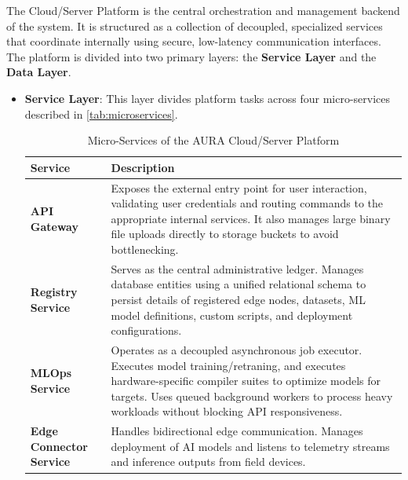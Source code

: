 The Cloud/Server Platform is the central orchestration and management backend of the system. It is structured as a collection of decoupled, specialized services that coordinate internally using secure, low-latency communication interfaces. The platform is divided into two primary layers: the \textbf{Service Layer} and the \textbf{Data Layer}.

\begin{itemize}
    
    \item \textbf{Service Layer}: This layer divides platform tasks across four micro-services described in \autoref{tab:microservices}.

    \begin{table}[H]
        \centering
        \caption{Micro-Services of the \acrshort{AURA} Cloud/Server Platform}
        \label{tab:microservices}
        \begin{tabular}{p{}p{}}
            \hline
            \textbf{Service} & \textbf{Description} \\
            \hline
            \textbf{\gls{API} Gateway} &
                Exposes the external entry point for user interaction, validating user credentials and routing commands to the appropriate internal services. It also manages large binary file uploads directly to storage buckets to avoid bottlenecking. \\
            \textbf{Registry Service} &
                Serves as the central administrative ledger. Manages database entities using a unified relational schema to persist details of registered edge nodes, datasets, \gls{ML} model definitions, custom scripts, and deployment configurations. \\
            \textbf{\gls{MLOps} Service} &
                Operates as a decoupled asynchronous job executor. Executes model training/retraning, and executes hardware-specific compiler suites to optimize models for targets. Uses queued background workers to process heavy workloads without blocking \gls{API} responsiveness. \\
            \textbf{Edge Connector Service} &
                Handles bidirectional edge communication. Manages deployment of \gls{AI} models and listens to telemetry streams and inference outputs from field devices. \\
            \hline
        \end{tabular}
    \end{table}


\end{itemize}
